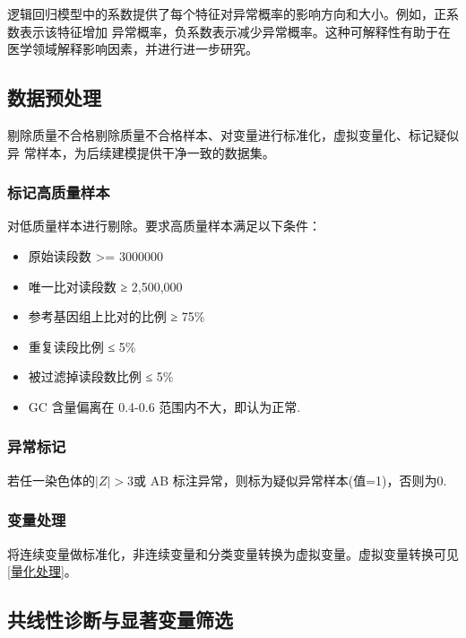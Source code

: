 \documentclass[withoutpreface,notoc]{cumcmthesis}
\begin{document}
	逻辑回归模型中的系数提供了每个特征对异常概率的影响方向和大小。例如，正系数表示该特征增加
	异常概率，负系数表示减少异常概率。这种可解释性有助于在医学领域解释影响因素，并进行进一步研究。











	\subsection{数据预处理}
	剔除质量不合格剔除质量不合格样本、对变量进行标准化，虚拟变量化、标记疑似异
	常样本，为后续建模提供干净一致的数据集。

	\subsubsection{标记高质量样本}

	对低质量样本进行剔除。要求高质量样本满足以下条件：
	\begin{itemize}
		\item 原始读段数 >= 3000000
		\item 唯一比对读段数 ≥ 2,500,000
		\item 参考基因组上比对的比例 ≥ 75\%
		\item 重复读段比例 ≤ 5\%
		\item 被过滤掉读段数比例 ≤ 5\%
		\item GC 含量偏离在 0.4-0.6 范围内不大，即认为正常.
	\end{itemize}

	\subsubsection{异常标记}

	若任一染色体的$|Z|>3$或 AB 标注异常，则标为疑似异常样本(值=1)，否则为0.


	\subsubsection{变量处理}

	将连续变量做标准化，非连续变量和分类变量转换为虚拟变量。虚拟变量转换可见\cref{量化处理}。

	

	\subsection{共线性诊断与显著变量筛选}
\end{document}

